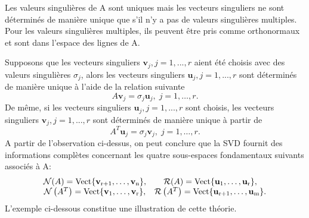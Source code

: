 \documentclass[11pt,a4paper,oneside]{book}
\def\v{\mathbf v}
\def\u{\mathbf u}
\def\spam{\rm Vect}
\begin{document}
Les valeurs singulières de A sont uniques mais les vecteurs singuliers ne sont déterminés de manière unique que s'il n'y a pas de valeurs singulières multiples. Pour les valeurs singulières multiples, ils peuvent être pris comme orthonormaux et sont dans l'espace
des lignes de A.

 Supposons que les vecteurs singuliers $ \v_{j}, j = 1,...,r $ aient été choisis avec des valeurs singulières $ \sigma_{j} $, alors les vecteurs singuliers $ \u_{j}, j = 1,...,r $ sont déterminés de manière unique à l'aide de la relation suivante
 \begin{equation}\label{uj}
 A\v_{j}=\sigma_{j}\u_{j},\; j=1,\dots,r.
 \end{equation}
De même, si les vecteurs singuliers  $ \u_{j}, j = 1,...,r $ sont choisis, les vecteurs singuliers  $ \v_{j}, j = 1,...,r $ sont déterminés de manière unique à partir de
\begin{equation}
A^{T}\u_{j}=\sigma_{j}\v_{j},\; j=1,\dots,r.
\end{equation}
A partir de l'observation ci-dessus, on peut conclure que la SVD fournit des informations complètes concernant les quatre sous-espaces fondamentaux suivants associés à A:
\begin{equation*}
\begin{matrix}
\mathcal{N}(A)=\spam\{\v_{r+1},\dots,\v_{n}\},&\mathcal{R}(A)=\spam\{\u_{1},\dots,\u_{r}\},\\
\mathcal{N}\left(A^{T}\right)=\spam\{\v_{1},\dots,\v_{r}\},&\mathcal{R}\left(A^{T}\right)=\spam\{\u_{r+1},\dots,\u_{m}\}.\\
\end{matrix}
\end{equation*} 
 L'exemple ci-dessous constitue une illustration de cette théorie.
\end{document}
